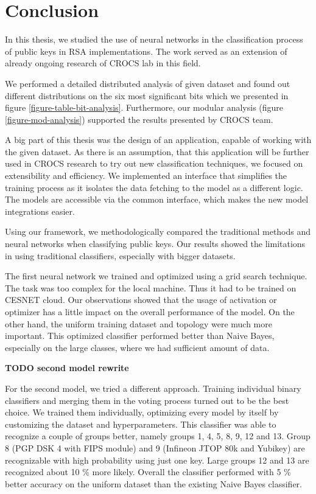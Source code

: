 \chapter{Conclusion}

In this thesis, we studied the use of neural networks in the classification process of public keys in RSA implementations. The work served as an extension of already ongoing research of CROCS lab in this field. 

We performed a detailed distributed analysis of given dataset and found out different distributions on the six most significant bits which we presented in figure \ref{figure-table-bit-analysis}. Furthermore, our modular analysis (figure \ref{figure-mod-analysis}) supported the results presented by CROCS team.

A big part of this thesis was the design of an application, capable of working with the given dataset. As there is an assumption, that this application will be further used in CROCS research to try out new classification techniques, we focused on extensibility and efficiency. We implemented an interface that simplifies the training process as it isolates the data fetching to the model as a different logic. The models are accessible via the common interface, which makes the new model integrations easier.

Using our framework, we methodologically compared the traditional methods and neural networks when classifying public keys. Our results showed the limitations in using traditional classifiers, especially with bigger datasets.

The first neural network we trained and optimized using a grid search technique. The task was too complex for the local machine. Thus it had to be trained on CESNET cloud. Our observations showed that the usage of activation or optimizer has a little impact on the overall performance of the model. On the other hand, the uniform training dataset and topology were much more important. This optimized classifier performed better than Naive Bayes, especially on the large classes, where we had sufficient amount of data.

\textbf{TODO second model rewrite}

For the second model, we tried a different approach. Training individual binary classifiers and merging them in the voting process turned out to be the best choice. We trained them individually, optimizing every model by itself by customizing the dataset and hyperparameters. This classifier was able to recognize a couple of groups better, namely groups 1, 4, 5, 8, 9, 12 and 13. Group 8 (PGP DSK 4 with FIPS module) and 9 (Infineon JTOP 80k and Yubikey) are recognizable with high probability using just one key. Large groups 12 and 13 are recognized about 10 \% more likely. Overall the classifier performed with 5 \% better accuracy on the uniform dataset than the existing Naive Bayes classifier.

